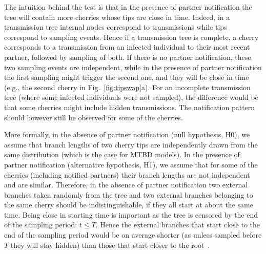 \documentclass[10pt,letterpaper]{article}
\begin{document}
The intuition behind the test is that in the presence of partner notification the tree will contain more cherries whose tips are close in time. Indeed, in a transmission tree internal nodes correspond to transmissions while tips correspond to sampling events. Hence if a transmission tree is complete, a cherry corresponds to a transmission from an infected individual to their most recent partner, followed by sampling of both. If there is no partner notification, these two sampling events are independent, while in the presence of partner notification the first sampling might trigger the second one, and they will be close in time (e.g., the second cherry in Fig.~\ref{fig:tipswap}a). For an incomplete transmission tree (where some infected individuals were not sampled), the difference would be that some cherries might include hidden transmissions. The notification pattern should however still be observed for some of the cherries.

More formally, in the absence of partner notification (null hypothesis, H0), we assume that branch lengths of two cherry tips are independently drawn from the same distribution (which is the case for MTBD models). In the presence of partner notification (alternative hypothesis, H1), we assume that for some of the cherries (including notified partners) their branch lengths are not independent and are similar. Therefore, in the absence of partner notification two external branches taken randomly from the tree and two external branches belonging to the same cherry should be indistinguishable, if they all start at about the same time. Being close in starting time is important as the tree is censored by the end of the sampling period: $t \leq T$. Hence the external branches that start close to the end of the sampling period would be on average shorter (as unless sampled before $T$ they will stay hidden) than those that start closer to the root~\cite{mooersBranchLengthsBirth2012}. %
\end{document}
